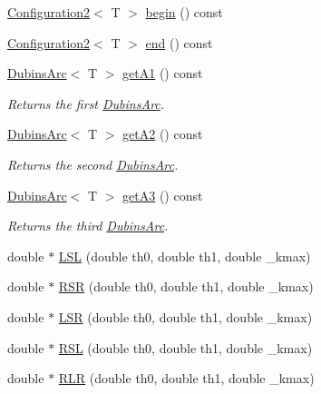 \begin{DoxyCompactItemize}
\mbox{\hyperlink{class_configuration2}{Configuration2}}$<$ T $>$ \mbox{\hyperlink{class_dubins_a29fee8022498722973b84ea4d85e6569}{begin}} () const
\item 
\mbox{\hyperlink{class_configuration2}{Configuration2}}$<$ T $>$ \mbox{\hyperlink{class_dubins_af18ddf1d635df0f33308e60a4b442159}{end}} () const
\item 
\mbox{\hyperlink{class_dubins_arc}{Dubins\+Arc}}$<$ T $>$ \mbox{\hyperlink{class_dubins_a8ef23becf55e74907b7b9eaa00431fa7}{get\+A1}} () const
\begin{DoxyCompactList}\small\item\em Returns the first {\ttfamily \mbox{\hyperlink{class_dubins_arc}{Dubins\+Arc}}}. \end{DoxyCompactList}\item 
\mbox{\hyperlink{class_dubins_arc}{Dubins\+Arc}}$<$ T $>$ \mbox{\hyperlink{class_dubins_a0291f2dc5b8225c0d85013d42749dd4b}{get\+A2}} () const
\begin{DoxyCompactList}\small\item\em Returns the second {\ttfamily \mbox{\hyperlink{class_dubins_arc}{Dubins\+Arc}}}. \end{DoxyCompactList}\item 
\mbox{\hyperlink{class_dubins_arc}{Dubins\+Arc}}$<$ T $>$ \mbox{\hyperlink{class_dubins_ae128ed13582151a7bd99c772c96d0402}{get\+A3}} () const
\begin{DoxyCompactList}\small\item\em Returns the third {\ttfamily \mbox{\hyperlink{class_dubins_arc}{Dubins\+Arc}}}. \end{DoxyCompactList}\item 
double $\ast$ \mbox{\hyperlink{class_dubins_a71a41035ec0b555fa0d386c6cbf2042f}{L\+SL}} (double th0, double th1, double \+\_\+kmax)
\item 
double $\ast$ \mbox{\hyperlink{class_dubins_ac7203da82ecbefb962e82efa02b005f7}{R\+SR}} (double th0, double th1, double \+\_\+kmax)
\item 
double $\ast$ \mbox{\hyperlink{class_dubins_a67df5f03a4bec3f6911898dc160d51ae}{L\+SR}} (double th0, double th1, double \+\_\+kmax)
\item 
double $\ast$ \mbox{\hyperlink{class_dubins_a168bfb98fd707750ebc509cfffd01c93}{R\+SL}} (double th0, double th1, double \+\_\+kmax)
\item 
double $\ast$ \mbox{\hyperlink{class_dubins_a3b05d5f9b3a6ca481224996660f3f8d0}{R\+LR}} (double th0, double th1, double \+\_\+kmax)
\item 

\end{DoxyCompactItemize}
